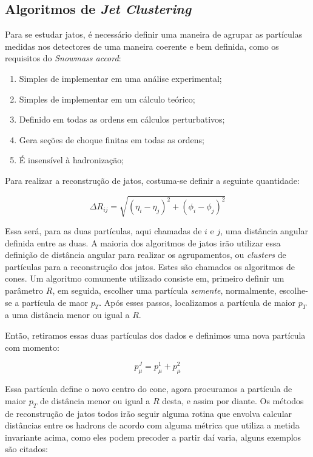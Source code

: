 \subsection{Algoritmos de {\it Jet Clustering}}

Para se estudar jatos, é necessário definir uma maneira de agrupar as partículas medidas nos detectores 
de uma maneira coerente e bem definida, como os requisitos do \emph{Snowmass accord}:

\begin{enumerate}
 \item Simples de implementar em uma análise experimental;
 \item Simples de implementar em um cálculo teórico;
 \item Definido em todas as ordens em cálculos perturbativos;
 \item Gera seções de choque finitas em todas as ordens;
 \item É insensível à hadronização;
\end{enumerate}

Para realizar a reconstrução de jatos\cite{salam_towards_2010}, costuma-se definir a seguinte quantidade:

\begin{equation}
 \Delta R_{ij} = \sqrt{(\eta_i-\eta_j)^2+(\phi_i-\phi_j)^2}
\end{equation}

Essa será, para as duas partículas, aqui chamadas de $i$ e $j$, uma distância angular
definida entre as duas. A maioria dos algoritmos de jatos irão utilizar essa definição de distância angular para realizar os agrupamentos,
ou {\it clusters} de partículas para a reconstrução dos jatos. Estes são chamados os algoritmos de cones. Um algoritmo
comumente utilizado consiste em, primeiro definir um parâmetro $R$, em seguida, escolher uma partícula {\it semente}, normalmente, escolhe-se
a partícula de maor $p_T$. Após esses passos, localizamos a partícula de maior $p_T$ a uma distância menor ou igual a $R$.
\par
Então, retiramos essas duas partículas dos dados e definimos uma nova partícula com momento:

\begin{equation}
 p_{\mu}^{J} = p_{\mu}^1 + p_{\mu}^2
\end{equation}

Essa partícula define o novo centro do cone, agora procuramos a partícula de maior $p_T$ de distância menor ou igual a $R$ desta, e assim por
diante. Os métodos de reconstrução de jatos todos irão seguir alguma rotina que envolva calcular distâncias entre os hadrons de acordo com
alguma métrica que utiliza a metida invariante acima, como eles podem precoder a partir daí varia, alguns exemplos são citados:

